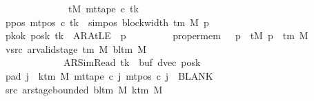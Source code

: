 \begin{isabellebody}
\ \ \ \ \ \ \ \ \ \ \ \ \ \ \ \ \ \ \ \ tM\ {\isacharparenleft}{\kern0pt}mt{\isacharunderscore}{\kern0pt}tape\ c{\isacharprime}{\kern0pt}\ tk{\isacharparenright}{\kern0pt}{\isachardoublequoteclose}\isanewline
\ \ \ \ \ \ \ ppos{\isacharcolon}{\kern0pt}\ {\isachardoublequoteopen}mt{\isacharunderscore}{\kern0pt}pos\ c{\isacharprime}{\kern0pt}\ tk\ {\isacharequal}{\kern0pt}\ sim{\isacharunderscore}{\kern0pt}pos\ {\isacharparenleft}{\kern0pt}block{\isacharunderscore}{\kern0pt}width\ {\isacharparenleft}{\kern0pt}{\isasymGamma}{\isacharunderscore}{\kern0pt}tm\ M{\isacharparenright}{\kern0pt}{\isacharparenright}{\kern0pt}\ p{\isachardoublequoteclose}\isanewline
\ \ \ \ \ \ \ pkok{\isacharcolon}{\kern0pt}\ {\isachardoublequoteopen}posk\ tk\ {\isacharequal}{\kern0pt}\ AR{\isacharunderscore}{\kern0pt}AtLE\ {\isasymlongleftrightarrow}\ p\ {\isacharequal}{\kern0pt}\ {}{\isachardoublequoteclose}\isanewline
\ \ \ \ \ \ \ proper{\isacharunderscore}{\kern0pt}mem{\isacharcolon}{\kern0pt}\ {\isachardoublequoteopen}{}\ {\isasymle}\ p\ {\isasymLongrightarrow}\ tM\ p\ {\isasymin}\ {\isasymGamma}{\isacharunderscore}{\kern0pt}tm\ M{\isachardoublequoteclose}\isanewline
\ \ \ \ \ \ \ vsrc{\isacharcolon}{\kern0pt}\ {\isachardoublequoteopen}ar{\isacharunderscore}{\kern0pt}valid{\isacharunderscore}{\kern0pt}stage\ {\isacharparenleft}{\kern0pt}{\isasymGamma}{\isacharunderscore}{\kern0pt}tm\ M{\isacharparenright}{\kern0pt}\ {\isacharparenleft}{\kern0pt}bl{\isacharunderscore}{\kern0pt}tm\ M{\isacharparenright}{\kern0pt}\isanewline
\ \ \ \ \ \ \ \ \ \ \ \ \ \ \ \ \ \ \ {\isacharparenleft}{\kern0pt}AR{\isacharunderscore}{\kern0pt}SimRead{\isacharcomma}{\kern0pt}\ tk{\isacharcomma}{\kern0pt}\ {}{\isacharcomma}{\kern0pt}\ buf{\isacharcomma}{\kern0pt}\ dvec{\isacharcomma}{\kern0pt}\ posk{\isacharparenright}{\kern0pt}{\isachardoublequoteclose}\isanewline
\ \ \ \ \ \ \ pad{}{\isacharcolon}{\kern0pt}\ {\isachardoublequoteopen}{\isasymforall}j\ {\isasymge}\ k{\isacharunderscore}{\kern0pt}tm\ M{\isachardot}{\kern0pt}\ mt{\isacharunderscore}{\kern0pt}tape\ c{\isacharprime}{\kern0pt}\ j\ {\isacharparenleft}{\kern0pt}mt{\isacharunderscore}{\kern0pt}pos\ c{\isacharprime}{\kern0pt}\ j{\isacharparenright}{\kern0pt}\ {\isacharequal}{\kern0pt}\ BLANK{}{\isachardoublequoteclose}\isanewline
\ \ \ \ \ \ \ src{}{\isacharcolon}{\kern0pt}\ {\isachardoublequoteopen}ar{\isacharunderscore}{\kern0pt}stage{\isacharunderscore}{\kern0pt}bounded\ {\isacharparenleft}{\kern0pt}bl{\isacharunderscore}{\kern0pt}tm\ M{\isacharparenright}{\kern0pt}\ {\isacharparenleft}{\kern0pt}k{\isacharunderscore}{\kern0pt}tm\ M{\isacharparenright}{\kern0pt}\isanewline

\end{isabellebody}
